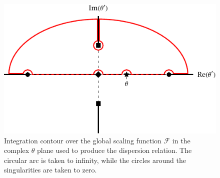 \documentclass[
  aps,
  pre,
  preprint,
  longbibliography,
  floatfix
]{revtex4-2}
\begin{document}
\begin{figure}
  \includegraphics{figs/contour_path.pdf}
  \caption{
    Integration contour over the global scaling function $\mathcal F$ in the
    complex $\theta$ plane used to produce the dispersion relation. The
    circular arc is taken to infinity, while the circles around the
    singularities are taken to zero.
  } \label{fig:contour}
\end{figure}
\end{document}
